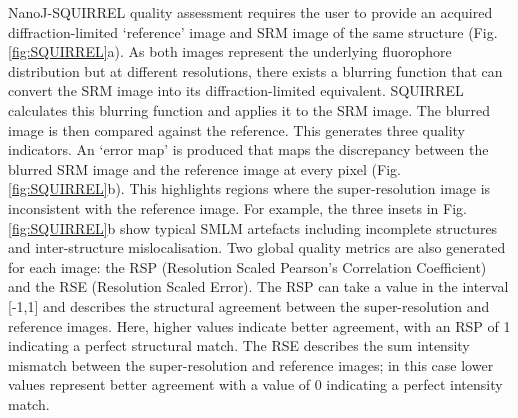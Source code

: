 NanoJ-SQUIRREL quality assessment requires the user to provide an acquired diffraction-limited `reference’ image and SRM image of the same structure (Fig. \ref{fig:SQUIRREL}a). As both images represent the underlying fluorophore distribution but at different resolutions, there exists a blurring function that can convert the SRM image into its diffraction-limited equivalent. SQUIRREL calculates this blurring function and applies it to the SRM image. The blurred image is then compared against the reference. This generates three quality indicators. An `error map’ is produced that maps the discrepancy between the blurred SRM image and the reference image at every pixel (Fig. \ref{fig:SQUIRREL}b). This highlights regions where the super-resolution image is inconsistent with the reference image. For example, the three insets in Fig. \ref{fig:SQUIRREL}b show typical SMLM artefacts including incomplete structures and inter-structure mislocalisation.  Two global quality metrics are also generated for each image: the RSP (Resolution Scaled Pearson’s Correlation Coefficient) and the RSE (Resolution Scaled Error). The RSP can take a value in the interval [-1,1] and describes the structural agreement between the super-resolution and reference images. Here, higher values indicate better agreement, with an RSP of 1 indicating a perfect structural match. The RSE describes the sum intensity mismatch between the super-resolution and reference images; in this case lower values represent better agreement with a value of 0 indicating a perfect intensity match.

